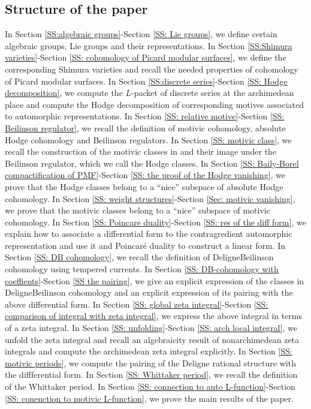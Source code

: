 \documentclass[11pt, a4paper]{amsart}
\theoremstyle{plain}
\theoremstyle{definition}
\numberwithin{equation}{section}
\begin{document}
\subsection{Structure of the paper}
In Section \ref{SS:algebraic groups}-Section \ref{SS: Lie groups}, we define certain algebraic groups, Lie groups and their representations. In Section \ref{SS:Shimura varieties}-Section \ref{SS: cohomology of Picard modular surfaces}, we define the corresponding Shimura varieties and recall the needed properties of cohomology of Picard modular surfaces. In Section \ref{SS:discrete series}-Section \ref{SS: Hodge decomposition}, we compute the $L$-packet of discrete series at the archimedean place and compute the Hodge decomposition of corresponding motives associated to automorphic representations. In Section \ref{SS: relative motive}-Section \ref{SS: Beilinson regulator}, we recall the definition of motivic cohomology, absolute Hodge cohomology and Beilinson regulators. In Section \ref{SS: motivic class}, we recall the construction of the motivic classes in \cite{LSZ22} and their image under the Beilinson regulator, which we call the Hodge classes. In Section \ref{SS: Baily-Borel compactification of PMF}-Section \ref{SS: the proof of the Hodge vanishing}, we prove that the Hodge classes belong to a ``nice'' subspace of absolute Hodge cohomology. In Section \ref{SS: weight structures}-Section \ref{Sec: motivic vanishing}, we prove that the motivic classes belong to a ``nice'' subspace of motivic cohomology. In Section \ref{SS: Poincare duality}-Section \ref{SS: res of the diff form}, we explain how to associate a differential form to the contragredient automorphic representation and use it and Poincar\'{e} duality to construct a linear form.  In Section \ref{SS: DB cohomology}, we recall the definition of Deligne{\textendash}Beilinson cohomology using tempered currents. In Section \ref{SS: DB-cohomology with coeffients}-Section \ref{SS the pairing}, we give an explicit expression of the classes in Deligne{\textendash}Beilinson cohomology and an explicit expression of its pairing with the above differential form. In Section \ref{SS: global zeta integral}-Section \ref{SS: comparison of integral with zeta integral}, we express the above integral in terms of a zeta integral. In Section \ref{SS: unfolding}-Section \ref{SS: arch local integral}, we unfold the zeta integral and recall an algebraicity result of nonarchimedean zeta integrals and compute the archimedean zeta integral explicitly. In Section \ref{SS: motivic periods}, we compute the pairing of the Deligne rational structure with the diffferential form. In Section \ref{SS: Whittaker period}, we recall the definition of the Whittaker period. In Section \ref{SS: connection to auto L-function}-Section \ref{SS: conenction to motivic L-function}, we prove the main results of the paper. 
\end{document}
